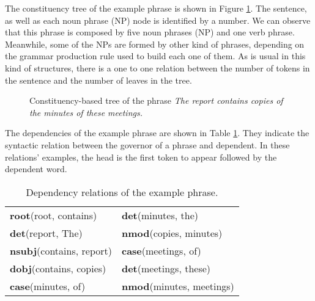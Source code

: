  The constituency tree of the example phrase is shown in Figure \ref{fig:tree}. The sentence, as well as each noun phrase (NP) node is identified by a number. We can observe that this phrase is composed by five noun phrases (NP) and one verb phrase. Meanwhile, some of the NPs are formed by other kind of phrases, depending on the grammar production rule used to build each one of them. As is usual in this kind of structures, there is a one to one relation between the number of tokens in the sentence  and the number of leaves in the tree.
 
 
 \begin{figure}[t]
 \centering
 \caption{Constituency-based tree of the phrase \textit{The report contains copies of the minutes of these meetings.}
 }
 \label{fig:tree}
 \end{figure}
 
 The dependencies of the example phrase are shown in Table \ref{tab:depends}.  They indicate the syntactic relation between the	  governor of a phrase and  dependent. In these relations' examples, the head is the first token to appear  followed by the dependent word.
 
 \begin{table}[]
 \centering
 \caption{Dependency relations of the example phrase.}
 \label{tab:depends}
 \begin{tabular}{l|l}
 \textbf{root}(root, contains)    & \textbf{det}(minutes, the)       \\
 \textbf{det}(report, The)        & \textbf{nmod}(copies, minutes)   \\
 \textbf{nsubj}(contains, report) & \textbf{case}(meetings, of)      \\
 \textbf{dobj}(contains, copies)  & \textbf{det}(meetings, these)    \\
 \textbf{case}(minutes, of)       & \textbf{nmod}(minutes, meetings)
 \end{tabular}
 \end{table}
 
